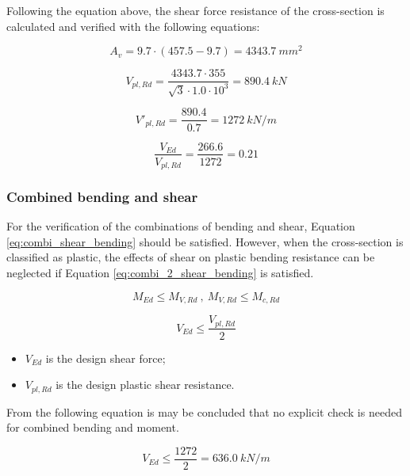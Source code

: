 Following the equation above, the shear force resistance of the cross-section is calculated and verified with the following equations:

\begin{equation}
    A_v = 9.7 \cdot (457.5 - 9.7) = 4343.7 \ mm^2
\end{equation}

\begin{equation}
    V_{pl,Rd} = \frac{4343.7 \cdot 355}{\sqrt{3} \cdot 1.0 \cdot 10^3} = 890.4 \ kN 
\end{equation}

\begin{equation}
    V'_{pl,Rd} = \frac{890.4}{0.7} = 1272 \ kN/m 
\end{equation}

\begin{equation}
    \frac{V_{Ed}}{V_{pl,Rd}} = \frac{266.6}{1272} = 0.21 
\end{equation}

\subsubsection{Combined bending and shear}

For the verification of the combinations of bending and shear, Equation \ref{eq:combi_shear_bending} should be satisfied. However, when the cross-section is classified as plastic, the effects of shear on plastic bending resistance can be neglected if Equation \ref{eq:combi_2_shear_bending} is satisfied. 

\begin{equation}
    M_{Ed} \leq M_{V,Rd} \ , \ M_{V,Rd} \leq M_{c,Rd}
    \label{eq:combi_shear_bending}
\end{equation}

\begin{equation}
    V_{Ed} \leq \frac{V_{pl,Rd}}{2}
    \label{eq:combi_2_shear_bending}
\end{equation}

\begin{itemize}
  \item $V_{Ed}$ is the design shear force;
  \item $V_{pl,Rd}$ is the design plastic shear resistance.
\end{itemize}

From the following equation is may be concluded that no explicit check is needed for combined bending and moment. 

\begin{equation}
    V_{Ed} \leq \frac{1272}{2} = 636.0 \ kN/m 
\end{equation}


